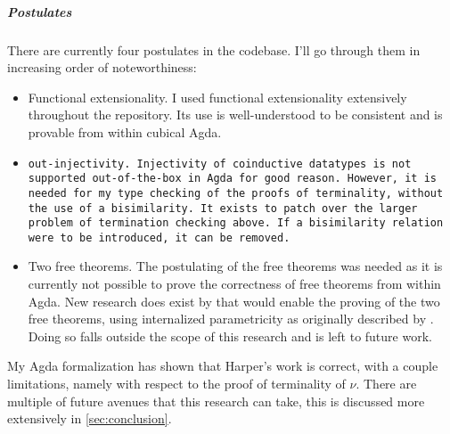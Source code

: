 \subparagraph{Postulates}
There are currently four postulates in the codebase.
I'll go through them in increasing order of noteworthiness:
\begin{itemize}[noitemsep]
  \item Functional extensionality.
  I used functional extensionality extensively throughout the repository.
  Its use is well-understood to be consistent and is provable from within cubical Agda.
  \item \tt{out}-injectivity.  Injectivity of coinductive datatypes is not supported out-of-the-box in Agda for good reason.
  However, it is needed for my type checking of the proofs of terminality, without the use of a bisimilarity.
  It exists to patch over the larger problem of termination checking above.
  If a bisimilarity relation were to be introduced, it can be removed.
  \item Two free theorems.
  The postulating of the free theorems was needed as it is currently not possible to prove the correctness of free theorems from within Agda.
  New research does exist by \cite{Muylder2024} that would enable the proving of the two free theorems, using internalized parametricity as originally described by \cite{Bernardy2012}.
  Doing so falls outside the scope of this research and is left to future work.
\end{itemize}


My Agda formalization has shown that Harper's work is correct, with a couple limitations, namely with respect to the proof of terminality of $\nu$.
There are multiple of future avenues that this research can take, this is discussed more extensively in \autoref{sec:conclusion}.

